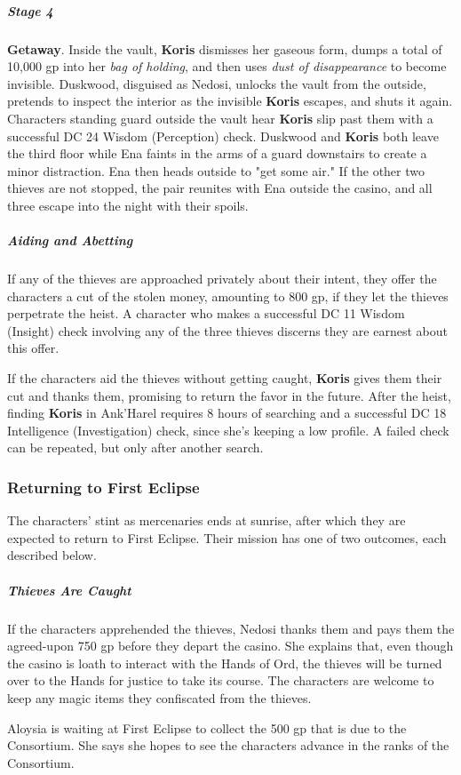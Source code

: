 \documentclass[10pt,a4paper,twoside,bg=print,twocolumn,openany,nodeprecatedcode]{dndbook}
\begin{document}
\subparagraph{Stage 4}
\textbf{Getaway}. Inside the vault, \textbf{Koris} dismisses her gaseous form, dumps a total of 10,000 gp into her \textit{bag of holding}, and then uses \textit{dust of disappearance} to become invisible. Duskwood, disguised as Nedosi, unlocks the vault from the outside, pretends to inspect the interior as the invisible \textbf{Koris} escapes, and shuts it again. Characters standing guard outside the vault hear \textbf{Koris} slip past them with a successful DC 24 Wisdom (Perception) check. Duskwood and \textbf{Koris} both leave the third floor while Ena faints in the arms of a guard downstairs to create a minor distraction. Ena then heads outside to "get some air." If the other two thieves are not stopped, the pair reunites with Ena outside the casino, and all three escape into the night with their spoils.

\subparagraph{Aiding and Abetting}
If any of the thieves are approached privately about their intent, they offer the characters a cut of the stolen money, amounting to 800 gp, if they let the thieves perpetrate the heist. A character who makes a successful DC 11 Wisdom (Insight) check involving any of the three thieves discerns they are earnest about this offer.

If the characters aid the thieves without getting caught, \textbf{Koris} gives them their cut and thanks them, promising to return the favor in the future. After the heist, finding \textbf{Koris} in Ank'Harel requires 8 hours of searching and a successful DC 18 Intelligence (Investigation) check, since she's keeping a low profile. A failed check can be repeated, but only after another search.

\subsubsection{Returning to First Eclipse}
The characters' stint as mercenaries ends at sunrise, after which they are expected to return to First Eclipse. Their mission has one of two outcomes, each described below.

\subparagraph{Thieves Are Caught}
If the characters apprehended the thieves, Nedosi thanks them and pays them the agreed-upon 750 gp before they depart the casino. She explains that, even though the casino is loath to interact with the Hands of Ord, the thieves will be turned over to the Hands for justice to take its course. The characters are welcome to keep any magic items they confiscated from the thieves.

Aloysia is waiting at First Eclipse to collect the 500 gp that is due to the Consortium. She says she hopes to see the characters advance in the ranks of the Consortium.
\end{document}
